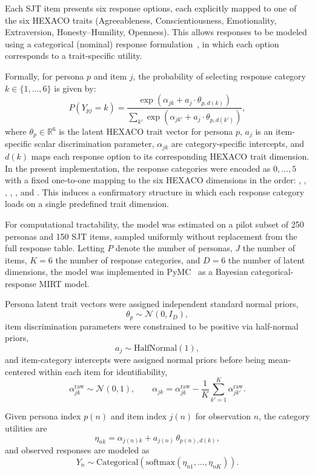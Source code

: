 Each SJT item presents six response options, each explicitly mapped to one of the six HEXACO traits (Agreeableness, Conscientiousness, Emotionality, Extraversion, Honesty--Humility, Openness). This allows responses to be modeled using a categorical (nominal) response formulation~\citep{bock1972estimating}, in which each option corresponds to a trait-specific utility.

Formally, for persona $p$ and item $j$, the probability of selecting response category $k \in \{1,\dots,6\}$ is given by:
\[
P(Y_{pj} = k) = \frac{\exp(\alpha_{jk} + a_j \cdot \theta_{p,d(k)})}{\sum_{k'} \exp(\alpha_{jk'} + a_j \cdot \theta_{p,d(k')})},
\]
where $\theta_p \in \mathbb{R}^6$ is the latent HEXACO trait vector for persona $p$, $a_j$ is an item-specific scalar discrimination parameter, $\alpha_{jk}$ are category-specific intercepts, and $d(k)$ maps each response option to its corresponding HEXACO trait dimension. In the present implementation, the response categories were encoded as $0,\dots,5$ with a fixed one-to-one mapping to the six HEXACO dimensions in the order: \agreeableness, \conscientiousness, \emotionality, \extraversion, \honestyhumility, and \openness. This induces a confirmatory structure in which each response category loads on a single predefined trait dimension.

For computational tractability, the model was estimated on a pilot subset of 250 personas and 150 SJT items, sampled uniformly without replacement from the full response table. Letting $P$ denote the number of personas, $J$ the number of items, $K=6$ the number of response categories, and $D=6$ the number of latent dimensions, the model was implemented in PyMC~\cite{pymc2023} as a Bayesian categorical-response MIRT model.

Persona latent trait vectors were assigned independent standard normal priors,
\[
\theta_p \sim \mathcal{N}(0, I_D),
\]
item discrimination parameters were constrained to be positive via half-normal priors,
\[
a_j \sim \mathrm{HalfNormal}(1),
\]
and item-category intercepts were assigned normal priors before being mean-centered within each item for identifiability,
\[
\alpha_{jk}^{\mathrm{raw}} \sim \mathcal{N}(0,1), \qquad
\alpha_{jk} = \alpha_{jk}^{\mathrm{raw}} - \frac{1}{K}\sum_{k'=1}^{K}\alpha_{jk'}^{\mathrm{raw}}.
\]

Given persona index $p(n)$ and item index $j(n)$ for observation $n$, the category utilities are
\[
\eta_{nk} = \alpha_{j(n)k} + a_{j(n)}\,\theta_{p(n),d(k)},
\]
and observed responses are modeled as
\[
Y_n \sim \mathrm{Categorical}\!\left(\mathrm{softmax}(\eta_{n1},\dots,\eta_{nK})\right).
\]

